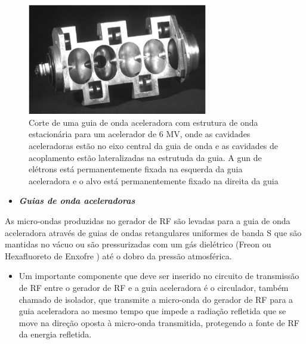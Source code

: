 \documentclass[11pt,a4paper]{article}
\begin{document}
                    \begin{figure}[h]
                        \centering
                        \includegraphics[width=0.7\textwidth]{Imagens/corteGuiaDeOndaEstacionaria.jpg}
                        \caption{Corte de uma guia de onda aceleradora com estrutura de onda estacionária para um acelerador de 6 MV, onde as cavidades aceleradoras estão no eixo central da guia de onda e as cavidades de acoplamento estão lateralizadas na estrutuda da guia. A gun de elétrons está permanentemente fixada na esquerda da guia aceleradora e o alvo está permanentemente fixado na direita da guia}
                        \label{fig:corteGuiaDeOndaEstacionaria}
                    \end{figure}


                \begin{itemize}
                    \item \textbf{\textit{\textcolor{CarnationPink}{Guias de onda aceleradoras}}}
                \end{itemize}


    As micro-ondas produzidas no gerador de RF são levadas para a guia de onda aceleradora através de guias de ondas retangulares uniformes de banda S que são mantidas no vácuo ou são pressurizadas com um gás dielétrico (Freon ou Hexafluoreto de Enxofre ) até o dobro da pressão atmosférica.

    \begin{itemize}
		\item Um importante componente que deve ser inserido no circuito de transmissão de RF entre o gerador de RF e a guia aceleradora é o circulador, também chamado de isolador, que transmite a micro-onda do gerador de RF para a guia aceleradora ao mesmo tempo que impede a radiação refletida que se move na direção oposta à micro-onda transmitida, protegendo a fonte de RF da energia refletida.
	\end{itemize}                
\end{document}
